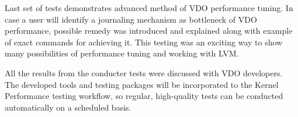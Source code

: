 \documentclass[
  color, %
  table, %
  lof,   %
  lot,   %
]{fithesis3}
\begin{document}
Last set of tests demonstrates advanced method of VDO performance tuning. In case a user will identify a journaling mechanism as bottleneck of VDO performance, possible remedy was introduced and explained along with example of exact commands for achieving it. This testing was an exciting way to show many possibilities of performance tuning and working with LVM.

All the results from the conducter tests were discussed with VDO developers. The developed tools and testing packages will be incorporated to the Kernel Performance testing workflow, so regular, high-quality tests can be conducted automatically on a scheduled basis.










\end{document}
